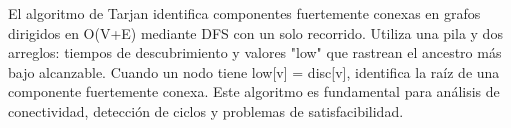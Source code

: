 \markdownRendererDocumentBegin
\markdownRendererSectionBegin
{}\markdownRendererInterblockSeparator
{}El algoritmo de Tarjan identifica componentes fuertemente conexas en grafos dirigidos en \markdownRendererDollarSign{}O(V+E)\markdownRendererDollarSign{} mediante DFS con un solo recorrido. Utiliza una pila y dos arreglos: tiempos de descubrimiento y valores "low" que rastrean el ancestro más bajo alcanzable. Cuando un nodo tiene \markdownRendererDollarSign{}low[v] = disc[v]\markdownRendererDollarSign{}, identifica la raíz de una componente fuertemente conexa. Este algoritmo es fundamental para análisis de conectividad, detección de ciclos y problemas de satisfacibilidad.\markdownRendererInterblockSeparator
{}
\markdownRendererSectionEnd \markdownRendererDocumentEnd